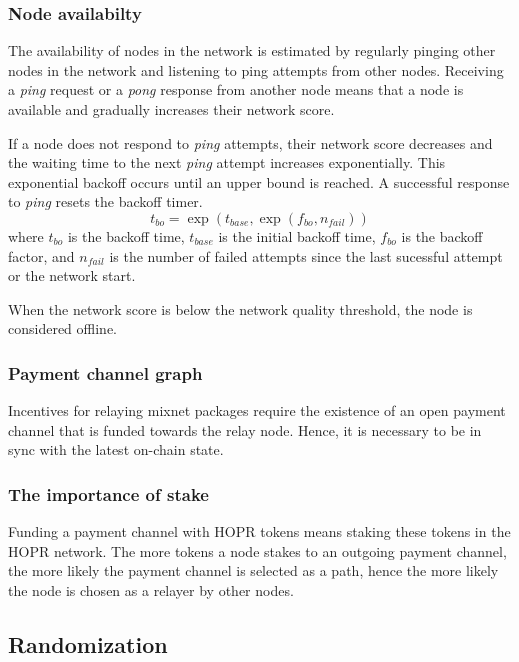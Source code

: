 \subsubsection{Node availabilty}

The availability of nodes in the network is estimated by regularly pinging other nodes in the network and listening to ping attempts from other nodes. Receiving a \textit{ping} request or a \textit{pong} response from another node means that a node is available and gradually increases their network score.

If a node does not respond to \textit{ping} attempts, their network score decreases and the waiting time to the next \textit{ping} attempt increases exponentially. This exponential backoff occurs until an upper bound is reached. A successful response to \textit{ping} resets the backoff timer.
$$t_{bo} = \exp (t_{base}, {\exp (f_{bo}, n_{fail})})$$
where $t_{bo}$ is the backoff time, $t_{base}$ is the initial backoff time, $f_{bo}$ is the backoff factor, and $ n_{fail}$ is the number of failed attempts since the last sucessful attempt or the network start.

When the network score is below the network quality threshold, the node is considered offline.

\subsubsection{Payment channel graph}

Incentives for relaying mixnet packages require the existence of an open payment channel that is funded towards the relay node. Hence, it is necessary to be in sync with the latest on-chain state.

\subsubsection{The importance of stake}

Funding a payment channel with HOPR tokens means staking these tokens in the HOPR network. The more tokens a node stakes to an outgoing payment channel, the more likely the payment channel is selected as a path, hence the more likely the node is chosen as a relayer by other nodes.

\subsection{Randomization}
\label{sec:path-selection:randomization}

